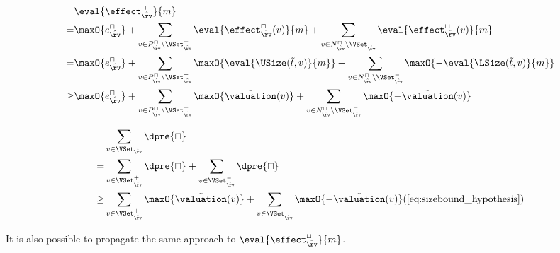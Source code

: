 \begin{equation} \label{eq:input_rv_reduction_upper}
  \begin{split}
  & \eval{\effect^\sqcap_{\hat{\rv}}}{m} \\
  = & \maxO{e^{\sqcap}_{\hat{\rv}}}
    + \sum_{v \in P_{\hat{\rv}}^\sqcap \setminus \VSet^+_{\hat{\rv}}} \eval{\effect^\sqcap_{\hat{\rv}}(v)}{m}
    + \sum_{v \in N_{\hat{\rv}}^\sqcap \setminus \VSet^-_{\hat{\rv}}} \eval{\effect^\sqcup_{\hat{\rv}}(v)}{m} \\
  = & \maxO{e^{\sqcap}_{\hat{\rv}}}
    + \sum_{v \in P_{\hat{\rv}}^\sqcap \setminus \VSet^+_{\hat{\rv}}} \maxO{\eval{\USize(\tilde{t}, v)}{m}}
    + \sum_{v \in N_{\hat{\rv}}^\sqcap \setminus \VSet^-_{\hat{\rv}}} \maxO{-\eval{\LSize(\tilde{t}, v)}{m}} \\
  \geq & \maxO{e^{\sqcap}_{\hat{\rv}}}
    + \sum_{v \in P_{\hat{\rv}}^\sqcap \setminus \VSet^+_{\hat{\rv}}} \maxO{\tilde{\valuation}(v)}
    + \sum_{v \in N_{\hat{\rv}}^\sqcap \setminus \VSet^-_{\hat{\rv}}} \maxO{-\tilde{\valuation}(v)} \\
  \end{split}
\end{equation}

\begin{equation} \label{eq:d_upper_reduction}
  \begin{split} 
  & \sum_{v \in \VSet_{\hat{\rv}}} \dpre{\sqcap} \\
  = & \sum_{v \in \VSet^+_{\hat{\rv}}} \dpre{\sqcap} + \sum_{v \in \VSet^-_{\hat{\rv}}} \dpre{\sqcap} \\
  \geq & \sum_{v \in \VSet^+_{\hat{\rv}}} \maxO{\tilde{\valuation}(v)} + \sum_{v \in \VSet^-_{\hat{\rv}}} \maxO{-\tilde{\valuation}(v)} (\ref{eq:sizebound_hypothesis}) \\
  \end{split}      
\end{equation}

It is also possible to propagate the same approach to $\eval{\effect^\sqcup_{\hat{\rv}}}{m}$.

